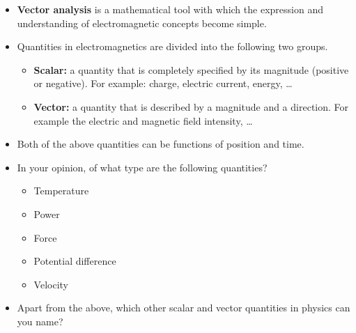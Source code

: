 \ELhold


\begin{ELunit}


\end{ELunit}

\ELhold


\begin{ELunit}

\begin{itemize}
\tightlist
\item
  \textbf{Vector analysis} is a mathematical tool with which the expression and understanding of electromagnetic concepts become simple.
\item
  Quantities in electromagnetics are divided into the following two groups.

  \begin{itemize}
  \tightlist
  \item
    \textbf{Scalar:} a quantity that is completely specified by its magnitude (positive or negative). For example: charge, electric current, energy, \ldots{}
  \item
    \textbf{Vector:} a quantity that is described by a magnitude and a direction. For example the electric and magnetic field intensity, \ldots{}
  \end{itemize}
\item
  Both of the above quantities can be functions of position and time.
\end{itemize}

\end{ELunit}


\begin{ELexample}{}

\begin{itemize}
\tightlist
\item
  In your opinion, of what type are the following quantities?

  \begin{itemize}
  \tightlist
  \item
    Temperature
  \item
    Power
  \item
    Force
  \item
    Potential difference
  \item
    Velocity
  \end{itemize}
\item
  Apart from the above, which other scalar and vector quantities in physics can you name?
\end{itemize}

\end{ELexample}

